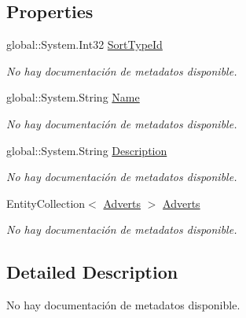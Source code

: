 \subsection*{Properties}
\begin{DoxyCompactItemize}
\item 
global\-::\-System.\-Int32 \hyperlink{class_microsoft_1_1_samples_1_1_kinect_1_1_basic_interactions_1_1_sort_types_a9bdd647541e70753c17aa5139a7a0722}{Sort\-Type\-Id}
\begin{DoxyCompactList}\small\item\em No hay documentación de metadatos disponible. \end{DoxyCompactList}\item 
global\-::\-System.\-String \hyperlink{class_microsoft_1_1_samples_1_1_kinect_1_1_basic_interactions_1_1_sort_types_af80bf742ee5db7a54f3fe66a8ebd7e67}{Name}
\begin{DoxyCompactList}\small\item\em No hay documentación de metadatos disponible. \end{DoxyCompactList}\item 
global\-::\-System.\-String \hyperlink{class_microsoft_1_1_samples_1_1_kinect_1_1_basic_interactions_1_1_sort_types_a93f5c6278aeb6821e1b8d3a3502101ec}{Description}
\begin{DoxyCompactList}\small\item\em No hay documentación de metadatos disponible. \end{DoxyCompactList}\item 
Entity\-Collection$<$ \hyperlink{class_microsoft_1_1_samples_1_1_kinect_1_1_basic_interactions_1_1_adverts}{Adverts} $>$ \hyperlink{class_microsoft_1_1_samples_1_1_kinect_1_1_basic_interactions_1_1_sort_types_a337764c13d18bcb3591c86b1a9dfa85d}{Adverts}
\begin{DoxyCompactList}\small\item\em No hay documentación de metadatos disponible. \end{DoxyCompactList}\end{DoxyCompactItemize}


\subsection{Detailed Description}
No hay documentación de metadatos disponible. 



